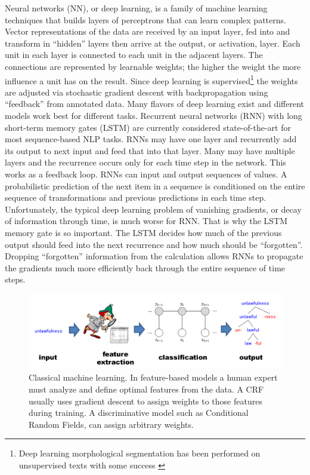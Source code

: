 \documentclass[12pt]{article}
\begin{document}
 Neural networks (NN), or deep learning, is a family of machine learning techniques that builds layers of perceptrons that can learn complex patterns. Vector representations of the data are received by an input layer, fed into and transform in ``hidden'' layers then arrive at the output, or activation, layer.  Each unit in each layer is connected to each unit in the adjacent layers. The connections are represented by learnable weights; the higher the weight the more influence a unit has on the result. Since deep learning is supervised\footnote{Deep learning morphological segmentation has been performed on unsupervised texts with some success \cite{wang_morphological_2016}} the weights are adjusted via stochastic gradient descent with backpropagation using ``feedback'' from annotated data. Many flavors of deep learning exist and different models work best for different tasks. Recurrent neural networks (RNN) \cite{Elman91} with long short-term memory gates (LSTM) \cite{Hochreiter_1997} are currently considered state-of-the-art for most sequence-based NLP tasks. RNNs may have one layer and recurrently add its output to next input and feed that into that layer. Many may have multiple layers and the recurrence occurs only for each time step in the network. This works as a feedback loop. RNNs can input and output sequences of values. A probabilistic prediction of the next item in a sequence is conditioned on the entire sequence of transformations and previous predictions in each time step. Unfortunately, the typical deep learning problem of vanishing gradients, or decay of information through time, is much worse for RNN. That is why the LSTM memory gate is so important. The LSTM decides how much of the previous output should feed into the next recurrence and how much should be ``forgotten''. Dropping ``forgotten'' information from the calculation allows RNNs to propagate the gradients much more efficiently back through the entire sequence of time steps.
 
 \begin{figure}[ht]
\begin{center}
\includegraphics[width=0.95\columnwidth]{Features-ML.PNG}
\caption{Classical machine learning. In feature-based models a human expert must analyze and define optimal features from the data. A CRF usually uses gradient descent to assign weights to those features during training. A discriminative model such as Conditional Random Fields, can assign arbitrary weights.}
\label{fig:Features-ML}
\end{center}
\end{figure}
\end{document}
